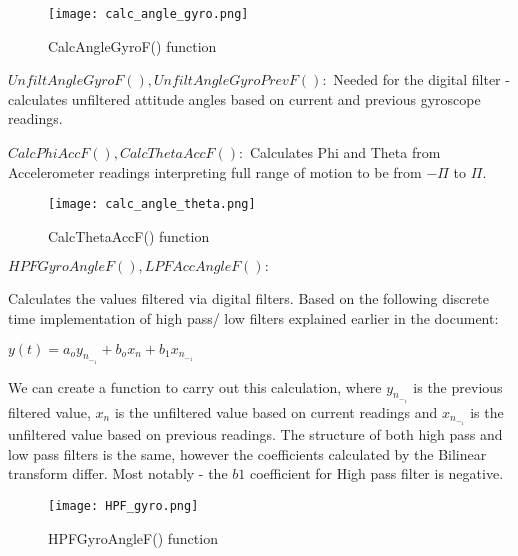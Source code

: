 \begin{flushleft}
\begin{flushleft}
\begin{figure}[H]
    \begin{center}
    \texttt{[image: calc\_angle\_gyro.png]}
    \end{center}
    \caption{CalcAngleGyroF() function}
    \label{fig:my_label}
\end{figure}

\begin{flushleft}
$UnfiltAngleGyroF(), UnfiltAngleGyroPrevF():$\newline
Needed for the digital filter - calculates unfiltered attitude angles based on current and previous gyroscope readings.

$CalcPhiAccF(), CalcThetaAccF():$\newline
Calculates Phi and Theta from Accelerometer readings interpreting full range of motion to be from $-\Pi$ to $\Pi$.

\begin{figure}[H]
    \begin{center}
    \texttt{[image: calc\_angle\_theta.png]}
    \end{center}
    \caption{CalcThetaAccF() function}
    \label{fig:my_label}
\end{figure}

\begin{flushleft}
$HPFGyroAngleF(), LPFAccAngleF():$\newline

Calculates the values filtered via digital filters. Based on the following discrete time implementation of high pass/ low filters explained earlier in the document:
\end{flushleft}
$y(t)=a_o y_n_-_1+b_ox_n+b_1x_n_-_1  $

\begin{flushleft}
We can create a function to carry out this calculation, where $y_n_-_1$ is the previous filtered value, $x_n$ is the unfiltered value based on current readings and $x_n_-_1$ is the unfiltered value based on previous readings. The structure of both high pass and low pass filters is the same, however the coefficients calculated by the Bilinear transform differ. Most notably - the 
$b1$ coefficient for High pass filter is negative.

\begin{figure}[H]
    \begin{center}
    \texttt{[image: HPF\_gyro.png]}
    \end{center}
    \caption{HPFGyroAngleF() function}
    \label{fig:my_label}
\end{figure}


\end{flushleft}
\end{flushleft}
\end{flushleft}
\end{flushleft}
